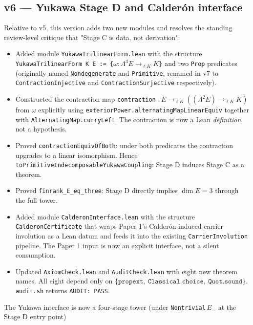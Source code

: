 \documentclass[11pt,a4paper]{article}
\begin{document}
\subsection*{v6 --- Yukawa Stage D and Calderón interface}

Relative to v5, this version adds two new modules and resolves
the standing review-level critique that "Stage C is data, not
derivation":

\begin{itemize}[leftmargin=1.6em, itemsep=2pt]
\item Added module \texttt{YukawaTrilinearForm.lean} with the
    structure
    \texttt{YukawaTrilinearForm K E := \{$\omega : \Lambda^3 E \to_{\ell K} K$\}}
    and two \texttt{Prop} predicates (originally named
    \texttt{Nondegenerate} and \texttt{Primitive}, renamed in
    v7 to \texttt{ContractionInjective} and
    \texttt{ContractionSurjective} respectively).
\item Constructed the contraction map
    \texttt{contraction} $: E \to_{\ell K} ((\Lambda^2 E) \to_{\ell K} K)$ from $\omega$
    explicitly using
    \texttt{exteriorPower.alternatingMapLinearEquiv} together
    with \texttt{AlternatingMap.curryLeft}. The contraction is
    now a Lean \emph{definition}, not a hypothesis.
\item Proved
    \texttt{contractionEquivOfBoth}: under both predicates the
    contraction upgrades to a linear isomorphism. Hence
    \texttt{toPrimitiveIndecomposableYukawaCoupling}: Stage D
    induces Stage C as a theorem.
\item Proved
    \texttt{finrank\_E\_eq\_three}: Stage D directly implies
    $\dim E = 3$ through the full tower.
\item Added module \texttt{CalderonInterface.lean} with the
    structure \texttt{CalderonCertificate} that wraps Paper 1's
    Calder\'on-induced carrier involution as a Lean datum and
    feeds it into the existing \texttt{CarrierInvolution}
    pipeline. The Paper 1 input is now an explicit
    interface, not a silent consumption.
\item Updated \texttt{AxiomCheck.lean} and
    \texttt{AuditCheck.lean} with eight new theorem names.
    All eight depend only on
    $\{\texttt{propext},\ \texttt{Classical.choice},\
    \texttt{Quot.sound}\}$. \texttt{audit.sh} returns
    \texttt{AUDIT:\ PASS}.
\end{itemize}

\smallskip
The Yukawa interface is now a four-stage tower (under
\texttt{Nontrivial}\,$E_-$ at the Stage D entry point)
\end{document}
